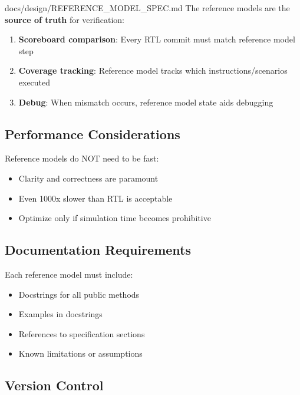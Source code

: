 \begin{relocated}{docs/design/REFERENCE_MODEL_SPEC.md}
The reference models are the \textbf{source of truth} for verification:

\begin{enumerate}
\def\labelenumi{\arabic{enumi}.}
\tightlist
\item
  \textbf{Scoreboard comparison}: Every RTL commit must match reference
  model step
\item
  \textbf{Coverage tracking}: Reference model tracks which
  instructions/\allowbreak{}scenarios executed
\item
  \textbf{Debug}: When mismatch occurs, reference model state aids
  debugging
\end{enumerate}

\subsection{Performance Considerations}\label{ds:ch:reference-model:performance-considerations}

Reference models do NOT need to be fast:

\begin{itemize}
\tightlist
\item
  Clarity and correctness are paramount
\item
  Even 1000x slower than RTL is acceptable
\item
  Optimize only if simulation time becomes prohibitive
\end{itemize}

\subsection{Documentation Requirements}\label{ds:ch:reference-model:documentation-requirements}

Each reference model must include:

\begin{itemize}
\tightlist
\item
  Docstrings for all public methods
\item
  Examples in docstrings
\item
  References to specification sections
\item
  Known limitations or assumptions
\end{itemize}

\subsection{Version Control}\label{ds:ch:reference-model:version-control}


\end{relocated}
